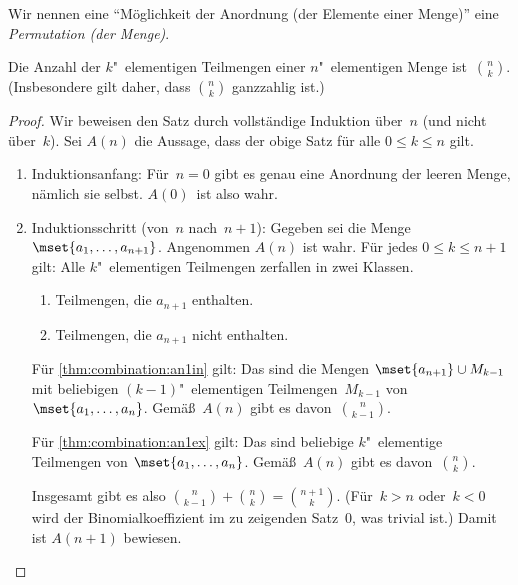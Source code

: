 \documentclass[a4paper]{article}
\begin{document}
\begin{notation}
    Wir nennen eine "`Möglichkeit der Anordnung (der Elemente einer Menge)"' eine \emph{Permutation (der Menge)}.
\end{notation}

\begin{theorem}[Kombination]
    Die Anzahl der $k$"~elementigen Teilmengen einer $n$"~elementigen Menge ist~$\binom{n}{k}$. (Insbesondere gilt daher, dass $\binom{n}{k}$ ganzzahlig ist.)
\end{theorem}

\begin{proof}
    Wir beweisen den Satz durch vollständige Induktion über~$n$ (und nicht über~$k$). Sei $A(n)$ die Aussage, dass der obige Satz für alle $0 \leq k \leq n$ gilt.

    \begin{enumerate}
        \item Induktionsanfang: Für~$n = 0$ gibt es genau eine Anordnung der leeren Menge, nämlich sie selbst. $A(0)$~ist also wahr.
        \item Induktionsschritt (von~$n$ nach~$n + 1$): Gegeben sei die Menge~$\mset{a_1, \dots, a_{n+1}}$. Angenommen $A(n)$ ist wahr. Für jedes $0 \leq k \leq n+1$ gilt: Alle $k$"~elementigen Teilmengen zerfallen in zwei Klassen.
              \begin{enumerate}
                  \item Teilmengen, die $a_{n+1}$ enthalten.\label{thm:combination:an1in}
                  \item Teilmengen, die $a_{n+1}$ nicht enthalten.\label{thm:combination:an1ex}
              \end{enumerate}

              Für \cref{thm:combination:an1in} gilt: Das sind die Mengen $\mset{a_{n + 1}} \cup M_{k - 1}$ mit beliebigen $(k - 1)$"~elementigen Teilmengen~$M_{k - 1}$ von $\mset{a_1, \dots, a_n}$. Gemäß~$A(n)$ gibt es davon~$\binom{n}{k - 1}$.

              Für \cref{thm:combination:an1ex} gilt: Das sind beliebige $k$"~elementige Teilmengen von $\mset{a_1, \dots, a_n}$. Gemäß~$A(n)$ gibt es davon~$\binom{n}{k}$.

              Insgesamt gibt es also $\binom{n}{k - 1} + \binom{n}{k} = \binom{n + 1}{k}$. (Für~$k > n$ oder~$k < 0$ wird der Binomialkoeffizient im zu zeigenden Satz~$0$, was trivial ist.) Damit ist $A(n + 1)$ bewiesen.\qedhere
    \end{enumerate}
\end{proof}
\end{document}
